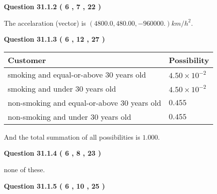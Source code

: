 \documentclass[12pt]{article}
\begin{document}
{\textbf{\Large{Question
31.1.2 
 (           6 ,           7 ,          22 )
}}}
  
  
 
 
\noindent{}
 
 
The accelaration (vector) is
$(
4800.0,
480.00 ,
-960000.
)km/h^2.
$
 
 
 
 
  
\vspace{0.2in}
  
{\textbf{\Large{Question
31.1.3 
 (           6 ,          12 ,          27 )
}}}
  
  
 
 
\noindent{}

 
\noindent
\begin{tabular}{|l|l|}
\hline
Customer & Possibility \\
\hline
smoking  and  %
equal-or-above 30 years old &
  $ %
4.50 \times 10^{-2}$ \\
\hline
smoking  and  %
under 30 years old &
  $ %
4.50 \times 10^{-2}$ \\
\hline
 non-smoking and  %
equal-or-above 30 years old &
  $ %
0.455$ \\
\hline
 non-smoking and  %
under 30 years old &
  $ %
0.455$ \\
\hline
\end{tabular}
 
\noindent
 And the total summation of all possibilities is $  %
1.000 $.
 
 
 
  
\vspace{0.2in}
  
{\textbf{\Large{Question
31.1.4 
 (           6 ,           8 ,          23 )
}}}
  
  
 
 
\noindent{}
 
 
none of these.
 
 
 
 
  
\vspace{0.2in}
  
{\textbf{\Large{Question
31.1.5 
 (           6 ,          10 ,          25 )
}}}
  
\end{document}
